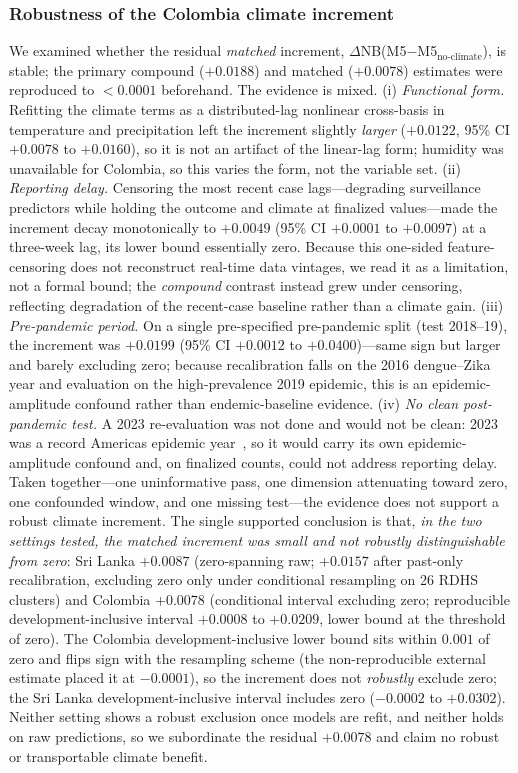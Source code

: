 \documentclass[11pt,a4paper]{article}
\begin{document}
\subsubsection*{Robustness of the Colombia climate increment}
We examined whether the residual \emph{matched} increment, $\Delta$NB(M5$-$M5$_{\text{no-climate}}$), is stable; the primary compound ($+0.0188$) and matched ($+0.0078$) estimates were reproduced to $<0.0001$ beforehand. The evidence is mixed. (i) \emph{Functional form.} Refitting the climate terms as a distributed-lag nonlinear cross-basis in temperature and precipitation left the increment slightly \emph{larger} ($+0.0122$, 95\% CI $+0.0078$ to $+0.0160$), so it is not an artifact of the linear-lag form; humidity was unavailable for Colombia, so this varies the form, not the variable set. (ii) \emph{Reporting delay.} Censoring the most recent case lags---degrading surveillance predictors while holding the outcome and climate at finalized values---made the increment decay monotonically to $+0.0049$ (95\% CI $+0.0001$ to $+0.0097$) at a three-week lag, its lower bound essentially zero. Because this one-sided feature-censoring does not reconstruct real-time data vintages, we read it as a limitation, not a formal bound; the \emph{compound} contrast instead grew under censoring, reflecting degradation of the recent-case baseline rather than a climate gain. (iii) \emph{Pre-pandemic period.} On a single pre-specified pre-pandemic split (test 2018--19), the increment was $+0.0199$ (95\% CI $+0.0012$ to $+0.0400$)---same sign but larger and barely excluding zero; because recalibration falls on the 2016 dengue--Zika year and evaluation on the high-prevalence 2019 epidemic, this is an epidemic-amplitude confound rather than endemic-baseline evidence. (iv) \emph{No clean post-pandemic test.} A 2023 re-evaluation was not done and would not be clean: 2023 was a record Americas epidemic year~\cite{PAHO2023,ValleDelCauca2024}, so it would carry its own epidemic-amplitude confound and, on finalized counts, could not address reporting delay. Taken together---one uninformative pass, one dimension attenuating toward zero, one confounded window, and one missing test---the evidence does not support a robust climate increment. The single supported conclusion is that, \emph{in the two settings tested, the matched increment was small and not robustly distinguishable from zero}: Sri Lanka $+0.0087$ (zero-spanning raw; $+0.0157$ after past-only recalibration, excluding zero only under conditional resampling on 26 RDHS clusters) and Colombia $+0.0078$ (conditional interval excluding zero; reproducible development-inclusive interval $+0.0008$ to $+0.0209$, lower bound at the threshold of zero). The Colombia development-inclusive lower bound sits within $0.001$ of zero and flips sign with the resampling scheme (the non-reproducible external estimate placed it at $-0.0001$), so the increment does not \emph{robustly} exclude zero; the Sri Lanka development-inclusive interval includes zero ($-0.0002$ to $+0.0302$). Neither setting shows a robust exclusion once models are refit, and neither holds on raw predictions, so we subordinate the residual $+0.0078$ and claim no robust or transportable climate benefit.
\end{document}
